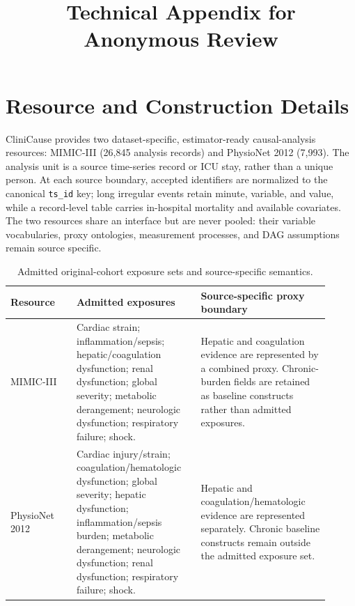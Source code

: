 \documentclass[letterpaper,10pt]{article}
\title{Technical Appendix for Anonymous Review}
\author{}
\date{}
\begin{document}
\maketitle
\small

\section{Resource and Construction Details}

CliniCause provides two dataset-specific, estimator-ready causal-analysis
resources: MIMIC-III (26,845 analysis records) and PhysioNet 2012 (7,993).
The analysis unit is a source time-series record or ICU stay, rather than a
unique person.  At each source boundary, accepted identifiers are normalized to
the canonical \texttt{ts\_id} key; long irregular events retain minute,
variable, and value, while a record-level table carries in-hospital mortality
and available covariates.  The two resources share an interface but are never
pooled: their variable vocabularies, proxy ontologies, measurement processes,
and DAG assumptions remain source specific.

\begin{table}[H]
\centering\small
\caption{Admitted original-cohort exposure sets and source-specific semantics.}
\label{tab:supp-resources}
\begin{tabular}{p{0.19\linewidth}p{0.35\linewidth}p{0.37\linewidth}}
\toprule
Resource & Admitted exposures & Source-specific proxy boundary\\
\midrule
MIMIC-III & Cardiac strain; inflammation/sepsis; hepatic/coagulation dysfunction; renal dysfunction; global severity; metabolic derangement; neurologic dysfunction; respiratory failure; shock. & Hepatic and coagulation evidence are represented by a combined proxy.  Chronic-burden fields are retained as baseline constructs rather than admitted exposures.\\
PhysioNet 2012 & Cardiac injury/strain; coagulation/hematologic dysfunction; global severity; hepatic dysfunction; inflammation/sepsis burden; metabolic derangement; neurologic dysfunction; renal dysfunction; respiratory failure; shock. & Hepatic and coagulation/hematologic evidence are represented separately.  Chronic baseline constructs remain outside the admitted exposure set.\\
\bottomrule
\end{tabular}
\end{table}
\end{document}
